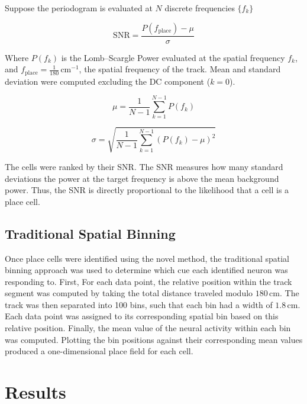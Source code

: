 \documentclass[preprint]{aastex701}
\begin{document}
Suppose the periodogram is evaluated at \( N \) discrete frequencies
\( \{ f_k \}\)

\begin{equation}
\mathrm{SNR}
=
\frac{
P\!\left( f_{\mathrm{place}} \right) - \mu
}{
\sigma
}
\end{equation}

Where \( P(f_k) \) is the Lomb--Scargle Power evaluated at the spatial frequency \( f_k \), and \( f_{\mathrm{place}} = \tfrac{1}{180}\,\mathrm{cm}^{-1} \), the spatial frequency of the track. Mean and standard deviation were computed excluding the DC component (\( k = 0 \)).

\begin{equation}
\mu
=
\frac{1}{N-1}
\sum_{k=1}^{N-1}
P(f_k)
\end{equation}

\begin{equation}
\sigma
=
\sqrt{
\frac{1}{N-1}
\sum_{k=1}^{N-1}
\left( P(f_k) - \mu \right)^2
}
\end{equation}

The cells were ranked by their SNR. The SNR measures how many standard deviations the power at the target frequency is above the mean background power. Thus, the SNR is directly proportional to the likelihood that a cell is a place cell.

\subsection{Traditional Spatial Binning}

Once place cells were identified using the novel method, the traditional spatial binning approach was used to determine which cue each identified neuron was responding to. First, For each data point, the relative position within the track segment was computed by taking the total distance traveled modulo \(180\,\mathrm{cm}\). The track was then separated into 100 bins, such that each bin had a width of \(1.8\,\mathrm{cm}\). Each data point was assigned to its corresponding spatial bin based on this relative position. Finally, the mean value of the neural activity within each bin was computed. Plotting the bin positions against their corresponding mean values produced a one-dimensional place field for each cell.

\section{Results}
\end{document}
